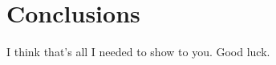 \chapter{Conclusions}%
\label{chap:conslusions}

I think that's all I needed to show to you. Good luck.